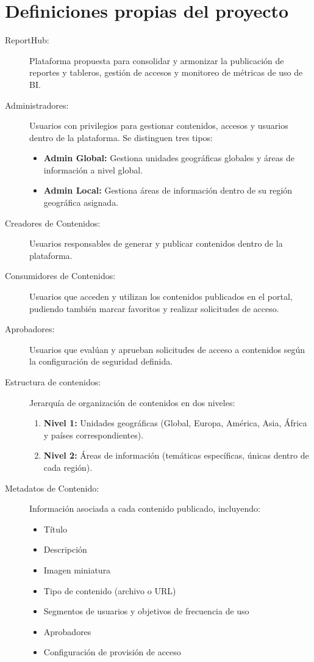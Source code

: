 \section{Definiciones propias del proyecto}

\begin{description}

\item[ReportHub:] Plataforma propuesta para consolidar y armonizar la publicación de reportes y tableros, gestión de accesos y monitoreo de métricas de uso de BI.

\item[Administradores:] Usuarios con privilegios para gestionar contenidos, accesos y usuarios dentro de la plataforma. Se distinguen tres tipos:
    \begin{itemize}
        \item \textbf{Admin Global:} Gestiona unidades geográficas globales y áreas de información a nivel global.
        \item \textbf{Admin Local:} Gestiona áreas de información dentro de su región geográfica asignada.
    \end{itemize}

\item[Creadores de Contenidos:] Usuarios responsables de generar y publicar contenidos dentro de la plataforma.

\item[Consumidores de Contenidos:] Usuarios que acceden y utilizan los contenidos publicados en el portal, pudiendo también marcar favoritos y realizar solicitudes de acceso.

\item[Aprobadores:] Usuarios que evalúan y aprueban solicitudes de acceso a contenidos según la configuración de seguridad definida.

\item[Estructura de contenidos:] Jerarquía de organización de contenidos en dos niveles:
    \begin{enumerate}
        \item \textbf{Nivel 1:} Unidades geográficas (Global, Europa, América, Asia, África y países correspondientes).
        \item \textbf{Nivel 2:} Áreas de información (temáticas específicas, únicas dentro de cada región).
    \end{enumerate}

\item[Metadatos de Contenido:] Información asociada a cada contenido publicado, incluyendo:
    \begin{itemize}
        \item Título
        \item Descripción
        \item Imagen miniatura
        \item Tipo de contenido (archivo o URL)
        \item Segmentos de usuarios y objetivos de frecuencia de uso
        \item Aprobadores
        \item Configuración de provisión de acceso
    \end{itemize}

\end{description}

